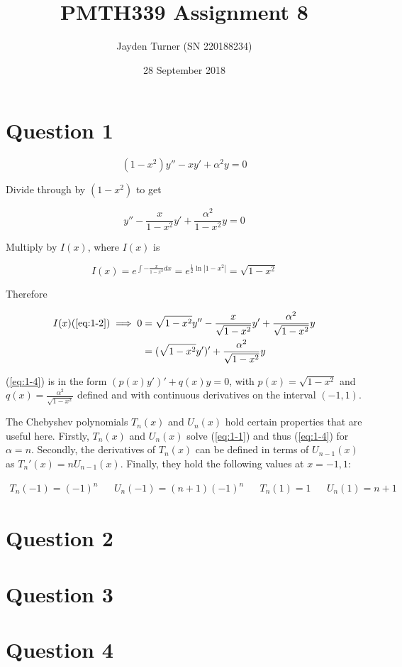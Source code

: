 \documentclass{article}
\title{PMTH339 Assignment 8}
\date{28 September 2018}
\author{Jayden Turner (SN 220188234)}
\begin{document}
\maketitle
{}

\section*{Question 1}

\begin{equation} \label{eq:1-1}
    (1 - x^2)y'' - xy' + \alpha^2y = 0
\end{equation}

Divide through by $(1 - x^2)$ to get

\begin{equation} \label{eq:1-2}
    y'' - \frac{x}{1 - x^2}y' + \frac{\alpha^2}{1 - x^2}y = 0
\end{equation}

Multiply by $I(x)$, where $I(x)$ is

\begin{equation} \label{eq:1-3}
    I(x) = e^{\int-\frac{x}{1 - x^2} dx}
        = e^{\frac{1}{2}\ln|1 - x^2|}
        = \sqrt{1 - x^2}
\end{equation}

Therefore

\begin{align}
    I(x)(\ref{eq:1-2}) \implies
    0 &= \sqrt{1 - x^2}y'' - \frac{x}{\sqrt{1 - x^2}}y' + \frac{\alpha^2}{\sqrt{1 - x^2}}y\nonumber\\
    &= (\sqrt{1 - x^2}y')' + \frac{\alpha^2}{\sqrt{1 - x^2}}y \label{eq:1-4}
\end{align}

(\ref{eq:1-4}) is in the form $(p(x)y')' + q(x)y = 0$, with $p(x) = \sqrt{1 - x^2}$ and
$q(x) = \frac{\alpha^2}{\sqrt{1 - x^2}}$ defined and with continuous derivatives on the interval
$(-1, 1)$.

\hfill\break
The Chebyshev polynomials $T_n(x)$ and $U_n(x)$ hold certain properties that are useful here.
Firstly, $T_n(x)$ and $U_n(x)$ solve (\ref{eq:1-1}) and thus (\ref{eq:1-4}) for $\alpha = n$.
Secondly, the derivatives of $T_n(x)$ can be defined in terms of $U_{n - 1}(x)$ as
$T_n'(x) = nU_{n - 1}(x)$. Finally, they hold the following values at $x = -1, 1$:

\begin{align} \label{eq:1-5}
    T_n(-1) = (-1)^n && U_n(-1) = (n + 1)(-1)^n && T_n(1) = 1 && U_n(1) = n + 1
\end{align}


\section*{Question 2}

\section*{Question 3}

\section*{Question 4}
\end{document}
